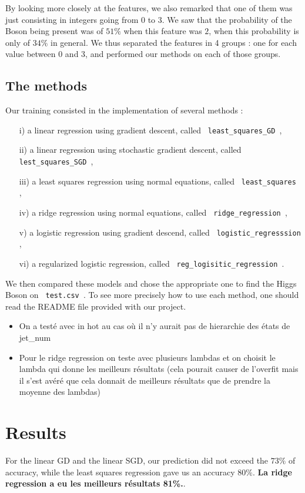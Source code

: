 \documentclass[11pt, oneside]{article}   	%
\begin{document}
By looking more closely at the features, we also remarked that one of them was just consisting in integers going from $0$ to $3$. We saw that the probability of the Boson being present was of $51\%$ when this feature was $2$, when this probability is only of $34\%$ in general. We thus separated the features in 4 groups : one for each value between $0$ and $3$, and performed our methods on each of those groups. 


\subsection{The methods}

Our training consisted in the implementation of several methods : \begin{itemize}
\item[i)] a linear regression using gradient descent, called \lstinline" least_squares_GD ",
\item[ii)] a linear regression using stochastic gradient descent, called \lstinline" lest_squares_SGD ",
\item[iii)] a least squares regression using normal equations, called \lstinline" least_squares ",
\item[iv)] a ridge regression using normal equations, called \lstinline" ridge_regression ",
\item[v)] a logistic regression using gradient descend, called \lstinline" logistic_regresssion ",
\item[vi)] a regularized logistic regression, called \lstinline" reg_logisitic_regression ".
\end{itemize} 
We then compared these models and chose the appropriate one to find the Higgs Boson on \lstinline! test.csv !. To see more precisely how to use each method, one should read the README file provided with our project.

\begin{itemize}
    \item On a testé avec in hot au cas où il n'y aurait pas de hierarchie des états de jet_num
    \item Pour le ridge regression on teste avec plusieurs lambdas et on choisit le lambda qui donne les meilleurs résultats (cela pourait causer de l'overfit mais il s'est avéré que cela donnait de meilleurs résultats que de prendre la moyenne des lambdas)
\end{itemize}

\section{Results}
For the linear GD and the linear SGD, our prediction did not exceed the $73\%$ of accuracy, while the least squares regression gave us an accuracy $80\%$.
\textbf{La ridge regression a eu les meilleurs résultats 81\%.}. 
\end{document}
